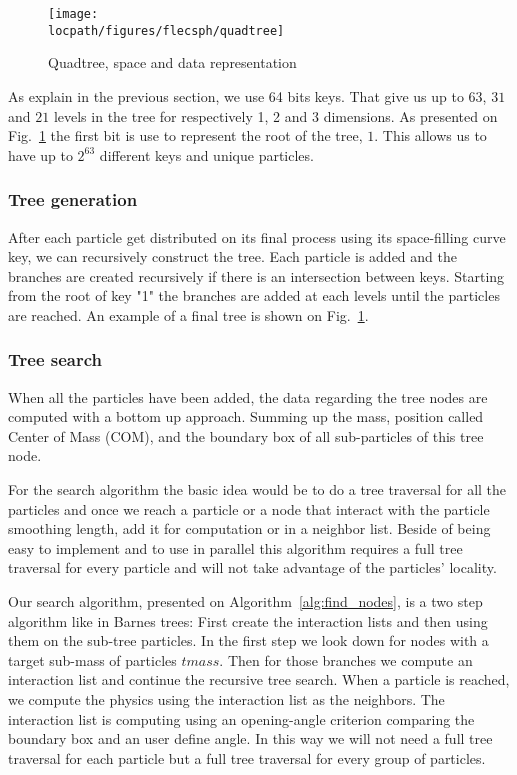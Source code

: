 \begin{figure}
\centering
\texttt{[image: \\locpath/figures/flecsph/quadtree]}
\caption{Quadtree, space and data representation}
\label{fig:quadtree}
\end{figure}

As explain in the previous section, we use 64 bits keys.
That give us up to $63$, $31$ and $21$ levels in the tree for respectively 1, 2 and 3 dimensions. 
As presented on Fig.~\ref{fig:quadtree} the first bit is use to represent the root of the tree, $1$.
This allows us to have up to $2^{63}$ different keys and unique particles.  

\subsubsection{Tree generation}

After each particle get distributed on its final process using its space-filling curve key, we can recursively construct the tree.
Each particle is added and the branches are created recursively if there is an intersection between keys. 
Starting from the root of key "1" the branches are added at each levels until the particles are reached.
An example of a final tree is shown on Fig.~\ref{fig:quadtree}.

\subsubsection{Tree search}

When all the particles have been added, the data regarding the tree nodes are computed with a bottom up approach. 
Summing up the mass, position called Center of Mass (COM), and the boundary box of all sub-particles of this tree node.

For the search algorithm the basic idea would be to do a tree traversal for all the particles and once we reach a particle or a node that interact with the particle smoothing length, add it for computation or in a neighbor list. 
Beside of being easy to implement and to use in parallel this algorithm requires a full tree traversal for every particle and will not take advantage of the particles' locality.

Our search algorithm, presented on Algorithm~\ref{alg:find_nodes}, is a two step algorithm like in Barnes trees: First create the interaction lists and then using them on the sub-tree particles. 
In the first step we look down for nodes with a target sub-mass of particles $tmass$. 
Then for those branches we compute an interaction list and continue the recursive tree search. 
When a particle is reached, we compute the physics using the interaction list as the neighbors. 
The interaction list is computing using an opening-angle criterion comparing the boundary box and an user define angle. 
In this way we will not need a full tree traversal for each particle but a full tree traversal for every group of particles.

